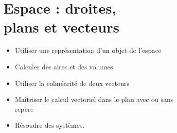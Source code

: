 \renewcommand\standalonepath[1]{G2/figures/#1}

\chapter[Espace : droites, plans et vecteurs]{Espace : droites,\\ plans et vecteurs}

\begin{prerequis}
  \begin{itemize}
  \item Utiliser une représentation d'un objet de l'espace
  \item Calculer des aires et des volumes
  \item Utiliser la colinéarité de deux vecteurs
  \item Maîtriser le calcul vectoriel dans le plan avec ou sans\\ repère
  \item Résoudre des systèmes.
  \end{itemize}
\end{prerequis}


